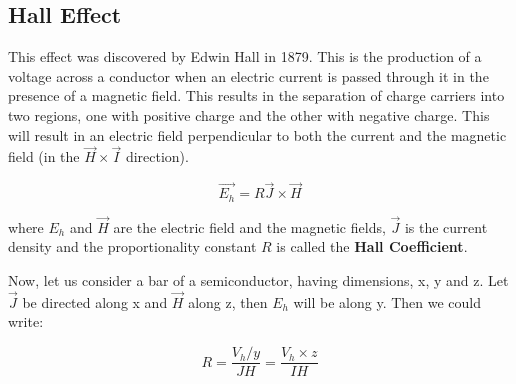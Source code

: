 	\subsection{Hall Effect}
		This effect was discovered by Edwin Hall in 1879. This is the production of a voltage across a conductor when an electric current is passed through it in the presence of a magnetic field. This results in the separation of charge carriers into two regions, one with positive charge and the other with negative charge. This will result in an electric field perpendicular to both the current and the magnetic field (in the $\vec{H}\times\vec{I}$ direction). 

		\begin{equation}
			\vec{E_h} = R \vec{J}\times\vec{H}
			\label{eqn:1}
		\end{equation}
		
		where $E_h$ and $\vec{H}$ are the electric field and the magnetic fields, $\vec{J}$ is the current density and the proportionality constant $R$ is called the \textbf{Hall Coefficient}.

		Now, let us consider a bar of a semiconductor, having dimensions, x, y and z. Let $\vec{J}$ be directed along x and $\vec{H}$ along z, then  $E_h$ will be along y. Then we could write:

		\begin{equation}
			R = \frac{V_h/y}{JH} = \frac{V_h\times z}{IH}
			\label{eqn:2}
		\end{equation}